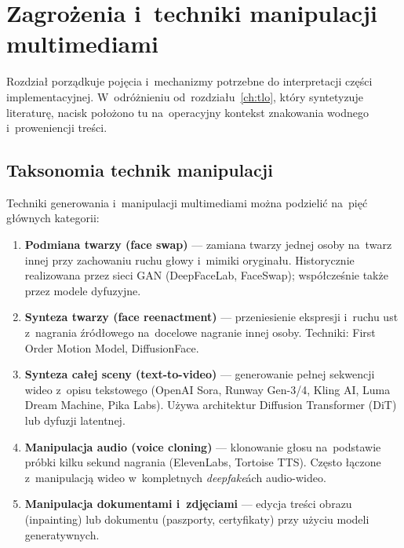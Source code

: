 \chapter{Zagro\.{z}enia i~techniki manipulacji multimediami}
\label{ch:zagrozenia}

Rozdzia\l{} porz\k{a}dkuje poj\k{e}cia i~mechanizmy potrzebne do interpretacji
cz\k{e}\'{s}ci implementacyjnej. W~odróżnieniu od~rozdziału~\ref{ch:tlo},
który syntetyzuje literatur\k{e}, nacisk po\l{}o\.{z}ono tu na~operacyjny kontekst
znakowania wodnego i~proweniencji tre\'{s}ci.

\section{Taksonomia technik manipulacji}
\label{sec:taksonomia}

Techniki generowania i~manipulacji multimediami mo\.{z}na podzieli\'{c}
na~pi\k{e}\'{c} g\l{}\'{o}wnych kategorii:

\begin{enumerate}
  \item \textbf{Podmiana twarzy (face swap)} ---
        zamiana twarzy jednej osoby na~twarz innej przy
        zachowaniu ruchu g\l{}owy i~mimiki orygina\l{}u.
        Historycznie realizowana przez sieci GAN
        (DeepFaceLab, FaceSwap); wsp\'{o}\l{}cze\'{s}nie
        tak\.{z}e przez modele dyfuzyjne.

  \item \textbf{Synteza twarzy (face reenactment)} ---
        przeniesienie ekspresji i~ruchu ust z~nagrania
        \'{z}r\'{o}d\l{}owego na~docelowe nagranie innej osoby.
        Techniki: First Order Motion Model, DiffusionFace.

  \item \textbf{Synteza ca\l{}ej sceny (text-to-video)} ---
        generowanie pe\l{}nej sekwencji wideo z~opisu
        tekstowego (OpenAI Sora, Runway Gen-3/4, Kling AI,
        Luma Dream Machine, Pika Labs).
        U\.{z}ywa architektur Diffusion Transformer (DiT)
        lub dyfuzji latentnej.

  \item \textbf{Manipulacja audio (voice cloning)} ---
        klonowanie g\l{}osu na~podstawie pr\'{o}bki kilku sekund
        nagrania (ElevenLabs, Tortoise TTS).
        Cz\k{e}sto \l{}\k{a}czone z~manipulacj\k{a} wideo
        w~kompletnych \textit{deepfake}\'{a}ch audio-wideo.

  \item \textbf{Manipulacja dokumentami i~zdj\k{e}ciami} ---
        edycja tre\'{s}ci obrazu (inpainting) lub dokumentu
        (paszporty, certyfikaty) przy u\.{z}yciu modeli
        generatywnych.
\end{enumerate}

